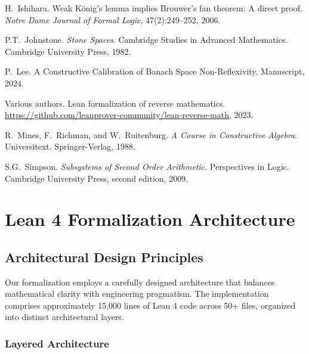 \documentclass[11pt]{article}
\theoremstyle{plain}
\theoremstyle{definition}
\begin{document}
\begin{thebibliography}{99}
H.~Ishihara.
\newblock Weak {K}\"{o}nig's lemma implies {B}rouwer's fan theorem: A direct proof.
\newblock \emph{Notre Dame Journal of Formal Logic}, 47(2):249--252, 2006.

P.T.~Johnstone.
\newblock \emph{Stone Spaces}.
\newblock Cambridge Studies in Advanced Mathematics. Cambridge University Press, 1982.

P.~Lee.
\newblock A Constructive Calibration of Banach Space Non-Reflexivity.
\newblock Manuscript, 2024.

Various authors.
\newblock Lean formalization of reverse mathematics.
\newblock \url{https://github.com/leanprover-community/lean-reverse-math}, 2023.

R.~Mines, F.~Richman, and W.~Ruitenburg.
\newblock \emph{A Course in Constructive Algebra}.
\newblock Universitext. Springer-Verlag, 1988.

S.G.~Simpson.
\newblock \emph{Subsystems of Second Order Arithmetic}.
\newblock Perspectives in Logic. Cambridge University Press, second edition, 2009.

\end{thebibliography}


\appendix

\section{Lean 4 Formalization Architecture}\label{app:formalization}

\subsection{Architectural Design Principles}

Our formalization employs a carefully designed architecture that balances mathematical clarity with engineering pragmatism. The implementation comprises approximately 15,000 lines of Lean 4 code across 50+ files, organized into distinct architectural layers.

\subsubsection{Layered Architecture}
\end{document}
